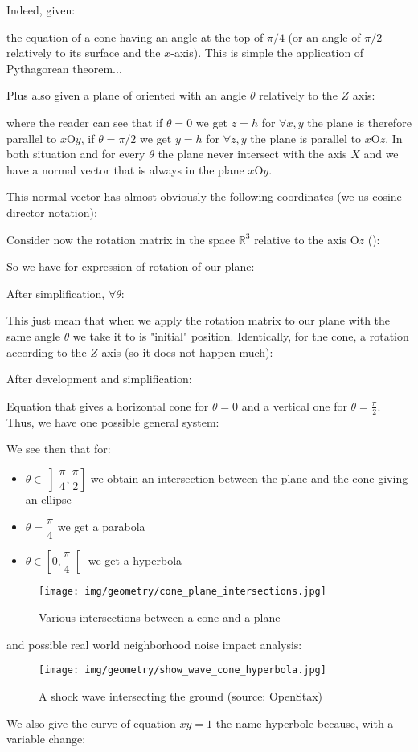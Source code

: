 \begin{enumerate}
		Indeed, given:		 
				
		the equation of a cone having an angle at the top of $\pi/4$ (or an angle of $\pi/2$ relatively to its surface and the $x$-axis). This is simple the application of Pythagorean theorem...
		
		Plus also given a plane of oriented with an angle $\theta$ relatively to the $Z$ axis:
		
		where the reader can see that if $\theta=0$ we get $z=h$ for $\forall x,y$ the plane is therefore parallel to $x\text{O}y$, if $\theta=\pi/2$ we get $y=h$ for $\forall z,y$ the plane is parallel to $x\text{O}z$. In both situation and for every $\theta$ the plane never intersect with the axis $X$ and we have a normal vector that is always in the plane $x\text{O}y$.
		
		This normal vector has almost obviously the following coordinates (we us cosine-director notation):
		
		Consider now the rotation matrix in the space $\mathbb{R}^3$ relative to the axis $\text{O}z$ ():
		
		So we have for expression of rotation of our plane:
		
		After simplification, $\forall \theta$:
		
		This just mean that when we apply the rotation matrix to our plane with the same angle $\theta$ we take it to is "initial" position.
		Identically, for the cone, a rotation according to the $Z$ axis (so it does not happen much):
		
		After development and simplification:
		
		Equation that gives a horizontal cone for $\theta=0$ and a vertical one for $\theta=\frac{\pi}{2}$.
		Thus, we have one possible general system:
		
		We see then that for:
		\begin{itemize}
			\item $\theta \in \left]\dfrac{\pi}{4},\dfrac{\pi}{2}\right]$ we obtain an intersection between the plane and the cone giving an ellipse
			\item $\theta=\dfrac{\pi}{4}$ we get a parabola
			\item $\theta \in \left[0,\dfrac{\pi}{4}\right[$ we get a hyperbola
		\end{itemize}
		\begin{figure}[H]
			\centering
			\texttt{[image: img/geometry/cone\_plane\_intersections.jpg]}
			\caption{Various intersections between a cone and a plane}
		\end{figure}
		and possible real world neighborhood noise impact analysis:
		\begin{figure}[H]
			\centering
			\texttt{[image: img/geometry/show\_wave\_cone\_hyperbola.jpg]}
			\caption{A shock wave intersecting the ground (source: OpenStax)}
		\end{figure}
		\begin{tcolorbox}[title=Remark,colframe=black,arc=10pt]
		We also give the curve of equation $xy=1$ the name hyperbole because, with a variable change:
		

\end{tcolorbox}
\end{enumerate}
